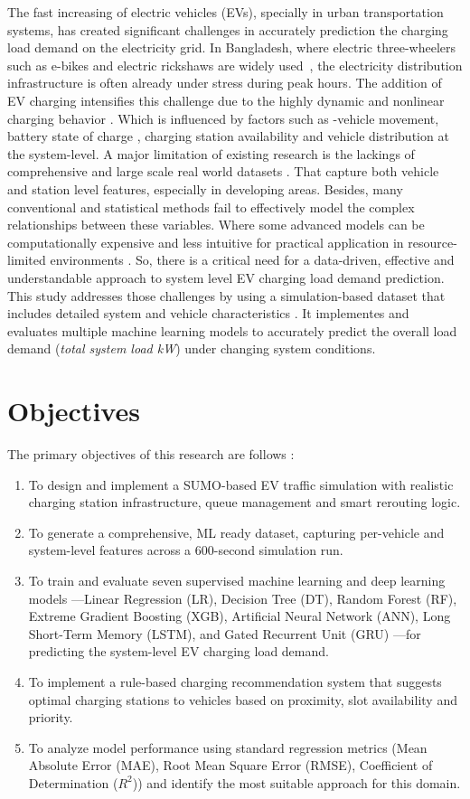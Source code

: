\documentclass{thesis-library}
\begin{document}
The fast increasing of electric vehicles (EVs), specially in urban transportation systems, has created significant challenges in accurately prediction the charging load demand on the electricity grid. 
In Bangladesh, where electric three-wheelers such as e-bikes and electric rickshaws are widely used~\cite{doley2024sustainability}, the electricity distribution infrastructure is often already under stress during peak hours.
The addition of EV charging intensifies this challenge due to the highly dynamic and nonlinear charging behavior . Which is influenced by factors such as -vehicle movement, battery state of charge , charging station availability and vehicle  distribution at the system-level.
A major limitation of existing research is the lackings of comprehensive and large scale real world datasets . That capture both vehicle and station level features, especially in developing areas. Besides, many conventional and statistical methods fail to effectively model the complex relationships between these variables. Where some advanced models can be computationally expensive and less intuitive for practical application in resource-limited environments \cite{kyriakopoulos_experimental_2026}.
So, there is a critical need for a data-driven, effective  and understandable approach to system level EV charging load demand prediction. This study addresses those challenges by using a simulation-based dataset that includes detailed system and vehicle characteristics . It implementes and evaluates multiple machine learning models to accurately predict the overall load demand (\textit{total system load kW}) under changing system conditions.

\section{Objectives}

The primary objectives of this research are follows :

\begin{enumerate}
  \item To design and implement a SUMO-based EV traffic simulation with realistic charging station infrastructure, queue management and smart rerouting logic.
  \item To generate a comprehensive, ML ready dataset, capturing per-vehicle and system-level features across a 600-second simulation run.
  \item To train and evaluate seven supervised machine learning and deep learning models —Linear Regression (LR), Decision Tree (DT), Random Forest (RF), Extreme Gradient Boosting (XGB), Artificial Neural Network (ANN), Long Short-Term Memory (LSTM), and Gated Recurrent Unit (GRU) —for predicting the system-level EV charging load demand.
  \item To implement a rule-based charging recommendation system  that suggests optimal charging stations to vehicles based on proximity, slot availability and priority.
  \item To analyze model performance using standard regression metrics (Mean Absolute Error (MAE), Root Mean Square Error (RMSE), Coefficient of Determination ($R^2$)) and identify the most suitable approach for this domain.
\end{enumerate}
\end{document}
